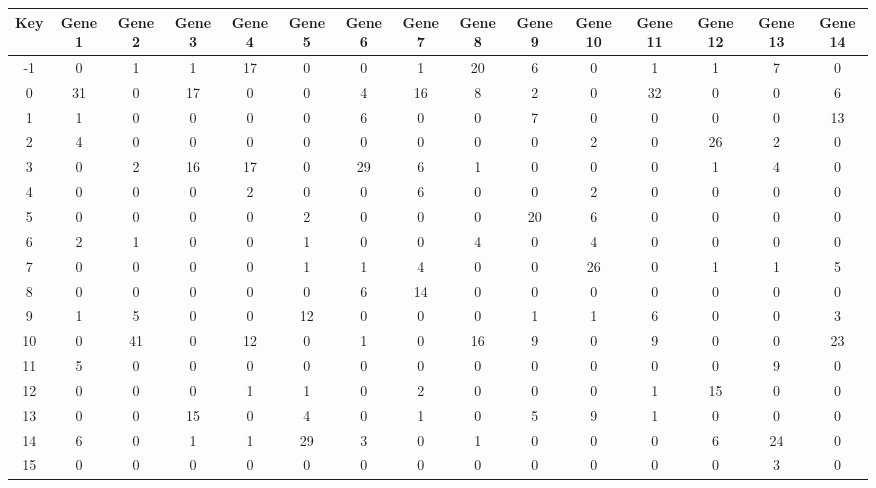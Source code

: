 \begin{tabular}{|c|c|c|c|c|c|c|c|c|c|c|c|c|c|c|}
\hline
Key & Gene 1 & Gene 2 & Gene 3 & Gene 4 & Gene 5 & Gene 6 & Gene 7 & Gene 8 & Gene 9 & Gene 10 & Gene 11 & Gene 12 & Gene 13 & Gene 14 \\
\hline
-1 & 0 & 1 & 1 & 17 & 0 & 0 & 1 & 20 & 6 & 0 & 1 & 1 & 7 & 0 \\
0 & 31 & 0 & 17 & 0 & 0 & 4 & 16 & 8 & 2 & 0 & 32 & 0 & 0 & 6 \\
1 & 1 & 0 & 0 & 0 & 0 & 6 & 0 & 0 & 7 & 0 & 0 & 0 & 0 & 13 \\
2 & 4 & 0 & 0 & 0 & 0 & 0 & 0 & 0 & 0 & 2 & 0 & 26 & 2 & 0 \\
3 & 0 & 2 & 16 & 17 & 0 & 29 & 6 & 1 & 0 & 0 & 0 & 1 & 4 & 0 \\
4 & 0 & 0 & 0 & 2 & 0 & 0 & 6 & 0 & 0 & 2 & 0 & 0 & 0 & 0 \\
5 & 0 & 0 & 0 & 0 & 2 & 0 & 0 & 0 & 20 & 6 & 0 & 0 & 0 & 0 \\
6 & 2 & 1 & 0 & 0 & 1 & 0 & 0 & 4 & 0 & 4 & 0 & 0 & 0 & 0 \\
7 & 0 & 0 & 0 & 0 & 1 & 1 & 4 & 0 & 0 & 26 & 0 & 1 & 1 & 5 \\
8 & 0 & 0 & 0 & 0 & 0 & 6 & 14 & 0 & 0 & 0 & 0 & 0 & 0 & 0 \\
9 & 1 & 5 & 0 & 0 & 12 & 0 & 0 & 0 & 1 & 1 & 6 & 0 & 0 & 3 \\
10 & 0 & 41 & 0 & 12 & 0 & 1 & 0 & 16 & 9 & 0 & 9 & 0 & 0 & 23 \\
11 & 5 & 0 & 0 & 0 & 0 & 0 & 0 & 0 & 0 & 0 & 0 & 0 & 9 & 0 \\
12 & 0 & 0 & 0 & 1 & 1 & 0 & 2 & 0 & 0 & 0 & 1 & 15 & 0 & 0 \\
13 & 0 & 0 & 15 & 0 & 4 & 0 & 1 & 0 & 5 & 9 & 1 & 0 & 0 & 0 \\
14 & 6 & 0 & 1 & 1 & 29 & 3 & 0 & 1 & 0 & 0 & 0 & 6 & 24 & 0 \\
15 & 0 & 0 & 0 & 0 & 0 & 0 & 0 & 0 & 0 & 0 & 0 & 0 & 3 & 0 \\
\hline
\end{tabular}